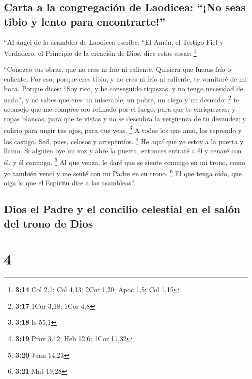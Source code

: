 \hypertarget{carta-a-la-congregaciuxf3n-de-laodicea-no-seas-tibio-y-lento-para-encontrarte}{%
\subsection{Carta a la congregación de Laodicea: ``¡No seas tibio y
lento para
encontrarte!''}\label{carta-a-la-congregaciuxf3n-de-laodicea-no-seas-tibio-y-lento-para-encontrarte}}

 ``Al ángel de la asamblea de Laodicea escribe: ``El
Amén, el Testigo Fiel y Verdadero, el Principio de la creación de Dios,
dice estas cosas: \footnote{\textbf{3:14} Col 2,1; Col 4,13; 2Cor 1,20;
  Apoc 1,5; Col 1,15}

 ``Conozco tus obras, que no eres ni frío ni caliente.
Quisiera que fueras frío o caliente.  Por eso, porque
eres tibio, y no eres ni frío ni caliente, te vomitaré de mi boca.
 Porque dices: ``Soy rico, y he conseguido riquezas, y no
tengo necesidad de nada'', y no sabes que eres un miserable, un pobre,
un ciego y un desnudo; \footnote{\textbf{3:17} 1Cor 3,18; 1Cor 4,8}
 te aconsejo que me compres oro refinado por el fuego,
para que te enriquezcas; y ropas blancas, para que te vistas y no se
descubra la vergüenza de tu desnudez; y colirio para ungir tus ojos,
para que veas. \footnote{\textbf{3:18} Is 55,1}  A todos
los que amo, los reprendo y los castigo. Sed, pues, celosos y
arrepentíos. \footnote{\textbf{3:19} Prov 3,12; Heb 12,6; 1Cor 11,32}
 He aquí que yo estoy a la puerta y llamo. Si alguien oye
mi voz y abre la puerta, entonces entraré a él y cenaré con él, y él
conmigo. \footnote{\textbf{3:20} Juan 14,23}  Al que
venza, le daré que se siente conmigo en mi trono, como yo también vencí
y me senté con mi Padre en su trono. \footnote{\textbf{3:21} Mat 19,28}
 El que tenga oído, que oiga lo que el Espíritu dice a
las asambleas''.

\hypertarget{dios-el-padre-y-el-concilio-celestial-en-el-saluxf3n-del-trono-de-dios}{%
\subsection{Dios el Padre y el concilio celestial en el salón del trono
de
Dios}\label{dios-el-padre-y-el-concilio-celestial-en-el-saluxf3n-del-trono-de-dios}}

\hypertarget{section-3}{%
\section{4}\label{section-3}}

